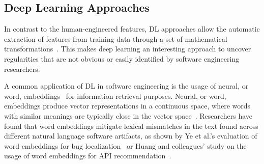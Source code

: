 









\subsection{Deep Learning Approaches}






In contrast to the human-engineered features,
\acf{DL} approaches allow the automatic extraction of features 
from training data through a set of mathematical transformations~\cite{Deng2018, zhang2021deep}.
This makes 
deep learning an interesting 
approach to
uncover regularities 
that are not obvious or easily identified
by software engineering researchers.




A common application of \acs{DL} in software engineering is the usage of neural, or word, embeddings~\cite{Mikolov2013}
for information retrieval purposes. 
Neural, or word, embeddings produce vector representations in a continuous space,
where words with similar meanings are typically close in the vector space~\cite{harris1954distributional, mikolov2013efficient}. 
Researchers have found that word
embeddings mitigate lexical mismatches in the text found across different 
natural language software artifacts,
as shown by Ye et al.'s evaluation of word embeddings
for bug localization~\cite{Ye2016}
or Huang and colleagues' study on 
the usage of word embeddings for API recommendation~\cite{Huang2018}.




